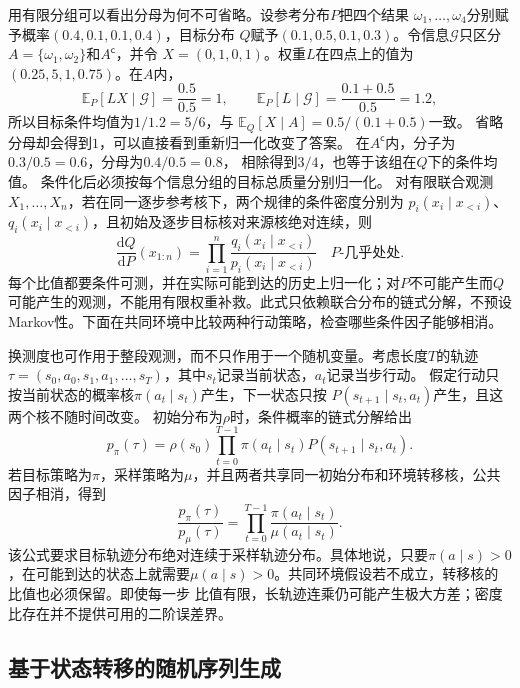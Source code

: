 用有限分组可以看出分母为何不可省略。设参考分布\(P\)把四个结果
\(\omega_1,\ldots,\omega_4\)分别赋予概率\((0.4,0.1,0.1,0.4)\)，目标分布
\(Q\)赋予\((0.1,0.5,0.1,0.3)\)。令信息\(\mathcal{G}\)只区分
\(A=\{\omega_1,\omega_2\}\)和\(A^{\mathsf c}\)，并令
\(X=(0,1,0,1)\)。权重\(L\)在四点上的值为\((0.25,5,1,0.75)\)。在\(A\)内，
\[
  \mathbb{E}_P[LX\mid\mathcal{G}]
  =\frac{0.5}{0.5}=1,\qquad
  \mathbb{E}_P[L\mid\mathcal{G}]
  =\frac{0.1+0.5}{0.5}=1.2,
\]
所以目标条件均值为\(1/1.2=5/6\)，与
\(\mathbb{E}_Q[X\mid A]=0.5/(0.1+0.5)\)一致。
省略分母却会得到\(1\)，可以直接看到重新归一化改变了答案。
在\(A^{\mathsf c}\)内，分子为\(0.3/0.5=0.6\)，分母为\(0.4/0.5=0.8\)，
相除得到\(3/4\)，也等于该组在\(Q\)下的条件均值。
条件化后必须按每个信息分组的目标总质量分别归一化。
对有限联合观测\(X_1,\ldots,X_n\)，若在同一逐步参考核下，两个规律的条件密度分别为
\(p_i(x_i\mid x_{<i})\)、\(q_i(x_i\mid x_{<i})\)，且初始及逐步目标核对来源核绝对连续，则
\[
\frac{\mathrm dQ}{\mathrm dP}(x_{1:n})
=\prod_{i=1}^n
\frac{q_i(x_i\mid x_{<i})}{p_i(x_i\mid x_{<i})}
\quad P\text{-几乎处处}.
\]
每个比值都要条件可测，并在实际可能到达的历史上归一化；对\(P\)不可能产生而\(Q\)可能产生的观测，不能用有限权重补救。此式只依赖联合分布的链式分解，不预设Markov性。下面在共同环境中比较两种行动策略，检查哪些条件因子能够相消。

换测度也可作用于整段观测，而不只作用于一个随机变量。考虑长度\(T\)的轨迹
\(\tau=(s_0,a_0,s_1,a_1,\ldots,s_T)\)，其中\(s_t\)记录当前状态，\(a_t\)记录当步行动。
假定行动只按当前状态的概率核\(\pi(a_t\mid s_t)\)产生，下一状态只按
\(P(s_{t+1}\mid s_t,a_t)\)产生，且这两个核不随时间改变。
初始分布为\(\rho\)时，条件概率的链式分解给出
\[ p_\pi(\tau)
  =\rho(s_0)\prod_{t=0}^{T-1}\pi(a_t\mid s_t)P(s_{t+1}\mid s_t,a_t). \]
若目标策略为\(\pi\)，采样策略为\(\mu\)，并且两者共享同一初始分布和环境转移核，公共因子相消，得到
\begin{equation}
  \frac{p_\pi(\tau)}{p_\mu(\tau)}
  =
  \prod_{t=0}^{T-1}
  \frac{\pi(a_t\mid s_t)}{\mu(a_t\mid s_t)}.
  \label{eq:probability-trajectory-likelihood-ratio}
\end{equation}
该公式要求目标轨迹分布绝对连续于采样轨迹分布。具体地说，只要\(\pi(a\mid s)>0\)，在可能到达的状态上就需要\(\mu(a\mid s)>0\)。共同环境假设若不成立，转移核的比值也必须保留。即使每一步
比值有限，长轨迹连乘仍可能产生极大方差；密度比存在并不提供可用的二阶误差界。

\subsection{基于状态转移的随机序列生成}

